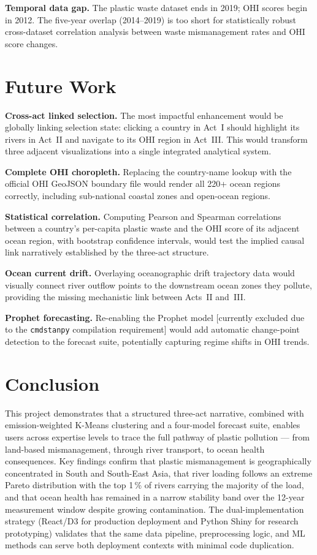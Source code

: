 \documentclass[10pt,twocolumn]{article}
\newcommand{\tool}[1]{\texttt{#1}}
\begin{document}
\textbf{Temporal data gap.}
The plastic waste dataset ends in 2019; OHI scores begin in 2012.
The five-year overlap (2014--2019) is too short for statistically robust
cross-dataset correlation analysis between waste mismanagement rates and
OHI score changes.

\section{Future Work}

\textbf{Cross-act linked selection.}
The most impactful enhancement would be globally linking selection state:
clicking a country in Act~I should highlight its rivers in Act~II and
navigate to its OHI region in Act~III.
This would transform three adjacent visualizations into a single
integrated analytical system.

\textbf{Complete OHI choropleth.}
Replacing the country-name lookup with the official OHI GeoJSON boundary
file would render all 220+ ocean regions correctly, including sub-national
coastal zones and open-ocean regions.

\textbf{Statistical correlation.}
Computing Pearson and Spearman correlations between a country's per-capita
plastic waste and the OHI score of its adjacent ocean region, with bootstrap
confidence intervals, would test the implied causal link narratively
established by the three-act structure.

\textbf{Ocean current drift.}
Overlaying oceanographic drift trajectory data would visually connect
river outflow points to the downstream ocean zones they pollute, providing
the missing mechanistic link between Acts~II and~III.

\textbf{Prophet forecasting.}
Re-enabling the Prophet model [currently excluded due to the \tool{cmdstanpy}
compilation requirement] would add automatic change-point detection to the
forecast suite, potentially capturing regime shifts in OHI trends.

\section{Conclusion}

This project demonstrates that a structured three-act narrative, combined with
emission-weighted K-Means clustering and a four-model forecast suite, enables
users across expertise levels to trace the full pathway of plastic pollution ---
from land-based mismanagement, through river transport, to ocean health
consequences.
Key findings confirm that plastic mismanagement is geographically concentrated
in South and South-East Asia, that river loading follows an extreme Pareto
distribution with the top 1\,\% of rivers carrying the majority of the load,
and that ocean health has remained in a narrow stability band over the 12-year
measurement window despite growing contamination.
The dual-implementation strategy (React/D3 for production deployment and
Python Shiny for research prototyping) validates that the same data pipeline,
preprocessing logic, and ML methods can serve both deployment contexts with
minimal code duplication.
\end{document}
